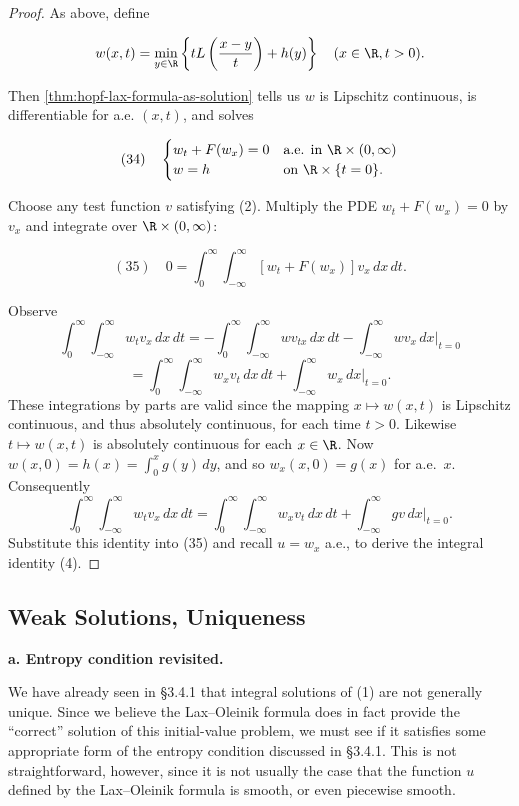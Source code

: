 \begin{proof}
As above, define

$$w(x,t) = \min_{y \in \R} \left\{tL\left(\frac{x-y}{t}\right) + h(y)\right\} \quad (x \in \R, t > 0).$$

Then \cref{thm:hopf-lax-formula-as-solution} tells us $w$ is Lipschitz continuous, is differentiable for a.e. $(x,t)$, and solves

$$(34) \quad \begin{cases} w_t + F(w_x) = 0 & \text{a.e. in } \R \times (0,\infty) \\ w = h & \text{on } \R \times \{t = 0\}. \end{cases}$$

Choose any test function $v$ satisfying (2). Multiply the PDE $w_t + F(w_x) = 0$ by $v_x$ and integrate over $\R \times (0,\infty)$:

$$(35) \quad 0 = \int_0^\infty \int_{-\infty}^\infty [w_t + F(w_x)] v_x \, dx \, dt.$$

Observe
$$\int_0^\infty \int_{-\infty}^\infty w_t v_x \, dx\,dt = -\int_0^\infty \int_{-\infty}^\infty w v_{tx}\,dx\,dt - \int_{-\infty}^\infty w v_x\,dx\Big|_{t=0}$$
$$= \int_0^\infty \int_{-\infty}^\infty w_x v_t\,dx\,dt + \int_{-\infty}^\infty w_x\,dx\Big|_{t=0}.$$
These integrations by parts are valid since the mapping $x \mapsto w(x,t)$ is Lipschitz continuous, and thus absolutely continuous, for each time $t > 0$. Likewise $t \mapsto w(x,t)$ is absolutely continuous for each $x \in \R$. Now $w(x,0) = h(x) = \int_0^x g(y)\,dy$, and so $w_x(x,0) = g(x)$ for a.e.\ $x$. Consequently
$$\int_0^\infty \int_{-\infty}^\infty w_t v_x\,dx\,dt = \int_0^\infty \int_{-\infty}^\infty w_x v_t\,dx\,dt + \int_{-\infty}^\infty gv\,dx\Big|_{t=0}.$$
Substitute this identity into (35) and recall $u = w_x$ a.e., to derive the integral identity (4).
\end{proof}

\subsection{Weak Solutions, Uniqueness}
\label{sec:conservation-laws-entropy-uniqueness}

\textbf{a. Entropy condition revisited.}

We have already seen in \S 3.4.1 that integral solutions of (1) are not generally unique. Since we believe the Lax--Oleinik formula does in fact provide the ``correct'' solution of this initial-value problem, we must see if it satisfies some appropriate form of the entropy condition discussed in \S 3.4.1. This is not straightforward, however, since it is not usually the case that the function $u$ defined by the Lax--Oleinik formula is smooth, or even piecewise smooth.

